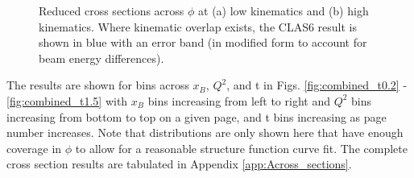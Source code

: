 \begin{figure}[H]
    \centering

    \hfill

    \caption[Reduced Cross Sections Across $\phi$]{Reduced cross sections across $\phi$ at (a) low kinematics and (b) high kinematics. Where kinematic overlap exists, the CLAS6 result \parencite{Bedlinskiy2014ExclusiveCLAS} is shown in blue with an error band (in modified form to account for beam energy differences). }\label{fig:redxsec_phi}
\end{figure}


The results are shown for bins across $x_B$, $Q^2$, and t in Figs. \ref{fig:combined_t0.2} - \ref{fig:combined_t1.5} with $x_B$ bins increasing from left to right and $Q^2$ bins increasing from bottom to top on a given page, and t bins increasing as page number increases. Note that distributions are only shown here that have enough coverage in $\phi$ to allow for a reasonable structure function curve fit. The complete cross section results are tabulated in Appendix \ref{app:Across_sections}.




